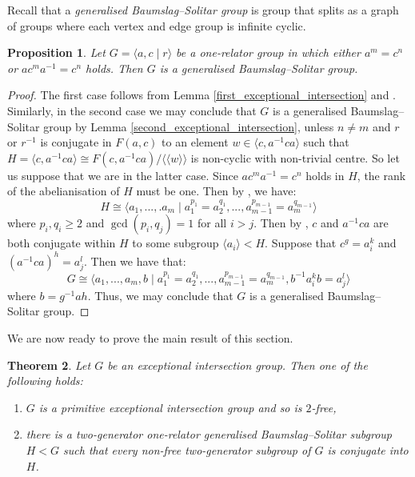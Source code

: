 \documentclass[11pt, a4paper]{amsart}
\newtheorem{theorem}{Theorem}[section]
\newtheorem{proposition}[theorem]{Proposition}
\theoremstyle{definition}
\newcommand{\isom}{\cong}
\newcommand{\normal}[1]{\langle\langle #1 \rangle\rangle}
\begin{document}
Recall that a \emph{generalised Baumslag--Solitar group} is group that splits as a graph of groups where each vertex and edge group is infinite cyclic.

\begin{proposition}
\label{gbs_relation}
Let $G = \langle a, c \mid r\rangle$ be a one-relator group in which either $a^m = c^n$ or $ac^ma^{-1} = c^n$ holds. Then $G$ is a generalised Baumslag--Solitar group.
\end{proposition}

\begin{proof}
The first case follows from Lemma \ref{first_exceptional_intersection} and \cite[Theorems 1 \& 3]{pietrowski_74}. Similarly, in the second case we may conclude that $G$ is a generalised Baumslag--Solitar group by Lemma \ref{second_exceptional_intersection}, unless $n\neq m$ and $r$ or $r^{-1}$ is conjugate in $F(a, c)$ to an element $w\in \langle c, a^{-1}ca\rangle$ such that $H = \langle c, a^{-1}ca\rangle\isom F(c, a^{-1}ca)/\normal{w}$ is non-cyclic with non-trivial centre. So let us suppose that we are in the latter case. Since $ac^ma^{-1} = c^n$ holds in $H$, the rank of the abelianisation of $H$ must be one. Then by \cite[Theorem 1]{pietrowski_74}, we have:
\[
H \isom \langle a_1, ...,. a_m \mid a_1^{p_1} = a_2^{q_1}, ..., a_{m-1}^{p_{m-1}} = a_m^{q_{m-1}}\rangle
\]
where $p_i, q_i\geq 2$ and $\gcd(p_i, q_j) = 1$ for all $i>j$. Then by \cite[Lemma 3]{pietrowski_74}, $c$ and $a^{-1}ca$ are both conjugate within $H$ to some subgroup $\langle a_i\rangle<H$. Suppose that $c^g = a_i^k$ and $(a^{-1}ca)^h = a_j^l$. Then we have that:
\[
G \isom \langle a_1, ..., a_m, b \mid a_1^{p_1} = a_2^{q_1}, ..., a_{m-1}^{p_{m-1}} = a_m^{q_{m-1}}, b^{-1}a_i^kb = a_j^l\rangle
\]
where $b = g^{-1}ah$. Thus, we may conclude that $G$ is a generalised Baumslag--Solitar group.
\end{proof}


We are now ready to prove the main result of this section.


\begin{theorem}
\label{exceptional_characterisation}
Let $G$ be an exceptional intersection group. Then one of the following holds:
\begin{enumerate}
\item\label{itm:not_neg} $G$ is a primitive exceptional intersection group and so is $2$-free,
\item\label{itm:has_GBS} there is a two-generator one-relator generalised Baumslag--Solitar subgroup $H<G$ such that every non-free two-generator subgroup of $G$ is conjugate into $H$.
\end{enumerate}
\end{theorem}
\end{document}
